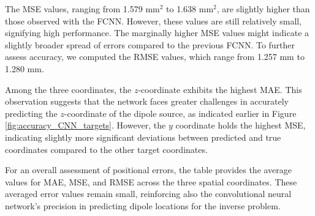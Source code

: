 \documentclass[a4paper, UKenglish, 11pt]{uiomaster}
\begin{document}
The MSE values, ranging from 1.579 mm$^2$ to 1.638 mm$^2$, are slightly higher than those observed with the FCNN. However, these values are still relatively small, signifying high performance. The marginally higher MSE values might indicate a slightly broader spread of errors compared to the previous FCNN. To further assess accuracy, we computed the RMSE values, which range from 1.257 mm to 1.280 mm.

Among the three coordinates, the $z$-coordinate exhibits the highest MAE. This observation suggests that the network faces greater challenges in accurately predicting the $z$-coordinate of the dipole source, as indicated earlier in Figure \ref{fig:accuracy_CNN_targets}. However, the $y$ coordinate holds the highest MSE, indicating slightly more significant deviations between predicted and true coordinates compared to the other target coordinates.

For an overall assessment of positional errors, the table provides the average values for MAE, MSE, and RMSE across the three spatial coordinates. These averaged error values remain small, reinforcing also the convolutional neural network's precision in predicting dipole locations for the inverse problem.
\end{document}
